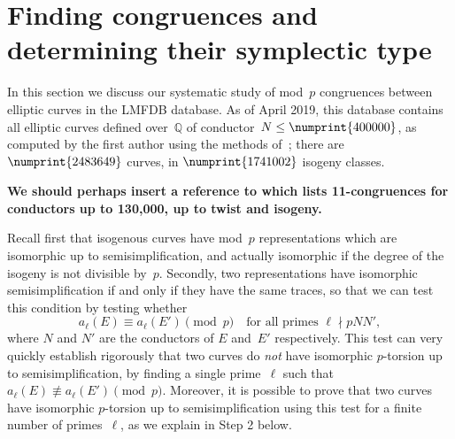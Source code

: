 \documentclass[12pt]{amsart}
\newcommand{\Q}{\mathbb{Q}}
\numberwithin{equation}{section}
\theoremstyle{definition}
\theoremstyle{remark}
\begin{document}
\section{Finding congruences and determining their symplectic type}\label{S:statistics}

In this section we discuss our systematic study of mod~$p$ congruences
between elliptic curves in the LMFDB database.  As of April 2019, this
database contains all elliptic curves defined over~$\Q$ of
conductor~$N\le\numprint{400000}$, as computed by the first author
using the methods of~\cite{AMEC}; there are $\numprint{2483649}$
curves, in $\numprint{1741002}$ isogeny classes.

\textbf{We should perhaps insert a reference to \cite{FisherList}
  which lists 11-congruences for conductors up to 130,000, up to twist
  and isogeny.}

Recall first that isogenous curves have mod~$p$ representations which
are isomorphic up to semisimplification, and actually isomorphic if
the degree of the isogeny is not divisible by~$p$.  Secondly, two
representations have isomorphic semisimplification if and only if they
have the same traces, so that we can test this condition by testing
whether
\[ a_{\ell}(E)\equiv a_{\ell}(E')\pmod{p}
\quad \text{for all primes } \ell \nmid pNN',
\] 
where $N$ and $N'$ are the conductors of $E$
and~$E'$ respectively.  This test can very quickly establish rigorously
that two curves do \emph{not} have isomorphic $p$-torsion up to
semisimplification, by finding  a single
prime~$\ell$ such that $a_{\ell}(E)\not\equiv a_{\ell}(E')\pmod{p}$.
Moreover, it is possible to prove that two curves have isomorphic $p$-torsion up to
semisimplification using this test for a finite number of
primes~$\ell$, as we explain in Step 2 below.
\end{document}
